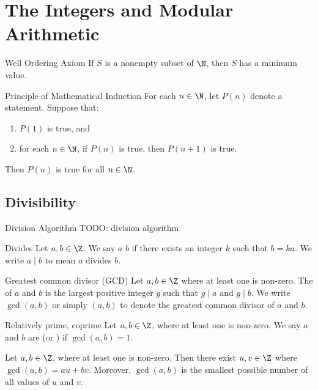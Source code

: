 \chapter{The Integers and Modular Arithmetic}

\begin{thmbox}{Well Ordering Axiom}{}
    If $S$ is a nonempty subset of $\N$, then $S$ has a minimum value.
\end{thmbox}

\begin{thmbox}{Principle of Mathematical Induction}{}
    For each $n \in \N$, let $P(n)$ denote a statement. Suppose that:
    \begin{enumerate}
        \item $P(1)$ is true, and
        \item for each $n \in \N$, if $P(n)$ is true, then $P(n+1)$ is true.
    \end{enumerate}
    Then $P(n)$ is true for all $n \in \N$.
\end{thmbox}

\section{Divisibility}
\begin{thmbox}{Division Algorithm}{}
    TODO: division algorithm
\end{thmbox}

\begin{dfnbox}{Divides}{}
    Let $a,b \in \Z$. We say $a$  $b$ if there exists an integer $k$ such that $b = ka$. We write $a \mid b$ to mean $a$ divides $b$.
\end{dfnbox}

\begin{dfnbox}{Greatest common divisor (GCD)}{}
    Let $a,b \in \Z$ where at least one is non-zero. The  of $a$ and $b$ is the largest positive integer $g$ such that $g \mid a$ and $g \mid b$. We write $\gcd(a,b)$ or simply $(a,b)$ to denote the greatest common divisor of $a$ and $b$.
\end{dfnbox}

\begin{dfnbox}{Relatively prime, coprime}{}
    Let $a,b \in \Z$, where at least one is non-zero. We say $a$ and $b$ are  (or ) if $\gcd(a,b) = 1$.
\end{dfnbox}

\begin{thmbox}{}{}
    Let $a,b \in \Z$, where at least one is non-zero. Then there exist $u,v \in \Z$ where $\gcd(a,b) = au + bv$. Moreover, $\gcd(a,b)$ is the smallest possible number of all values of $u$ and $v$.
\end{thmbox}

